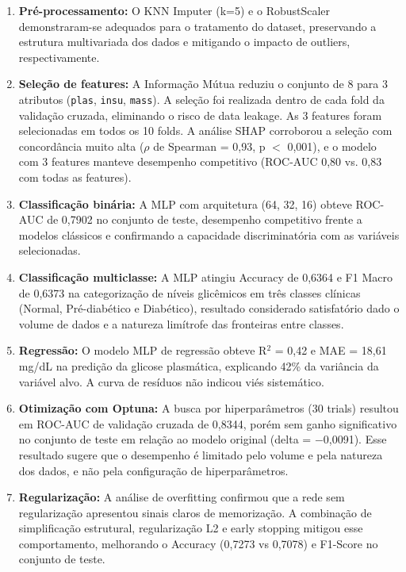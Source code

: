 \documentclass[12pt]{article}
\begin{document}
\begin{enumerate}
\item \textbf{Pré-processamento:} O KNN Imputer (k=5) e o RobustScaler demonstraram-se adequados para o tratamento do dataset, preservando a estrutura multivariada dos dados e mitigando o impacto de outliers, respectivamente.

\item \textbf{Seleção de features:} A Informação Mútua reduziu o conjunto de 8 para 3 atributos (\texttt{plas}, \texttt{insu}, \texttt{mass}). A seleção foi realizada dentro de cada fold da validação cruzada, eliminando o risco de data leakage. As 3 features foram selecionadas em todos os 10 folds. A análise SHAP corroborou a seleção com concordância muito alta ($\rho$ de Spearman = 0,93, p $<$ 0,001), e o modelo com 3 features manteve desempenho competitivo (ROC-AUC 0,80 vs. 0,83 com todas as features).

\item \textbf{Classificação binária:} A MLP com arquitetura (64, 32, 16) obteve ROC-AUC de 0,7902 no conjunto de teste, desempenho competitivo frente a modelos clássicos e confirmando a capacidade discriminatória com as variáveis selecionadas.

\item \textbf{Classificação multiclasse:} A MLP atingiu Accuracy de 0,6364 e F1 Macro de 0,6373 na categorização de níveis glicêmicos em três classes clínicas (Normal, Pré-diabético e Diabético), resultado considerado satisfatório dado o volume de dados e a natureza limítrofe das fronteiras entre classes.

\item \textbf{Regressão:} O modelo MLP de regressão obteve R$^2$ = 0,42 e MAE = 18,61 mg/dL na predição da glicose plasmática, explicando 42\% da variância da variável alvo. A curva de resíduos não indicou viés sistemático.

\item \textbf{Otimização com Optuna:} A busca por hiperparâmetros (30 trials) resultou em ROC-AUC de validação cruzada de 0,8344, porém sem ganho significativo no conjunto de teste em relação ao modelo original (delta = $-$0,0091). Esse resultado sugere que o desempenho é limitado pelo volume e pela natureza dos dados, e não pela configuração de hiperparâmetros.

\item \textbf{Regularização:} A análise de overfitting confirmou que a rede sem regularização apresentou sinais claros de memorização. A combinação de simplificação estrutural, regularização L2 e early stopping mitigou esse comportamento, melhorando o Accuracy (0,7273 vs 0,7078) e F1-Score no conjunto de teste.

\end{enumerate}
\end{document}
